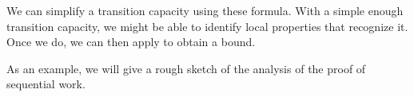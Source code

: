 We can simplify a transition capacity using these formula.
With a simple enough transition capacity,
we might be able to identify local properties that recognize it.
Once we do, we can then apply  to obtain a bound.

As an example, we will give a rough sketch of the analysis of the proof of sequential work.
